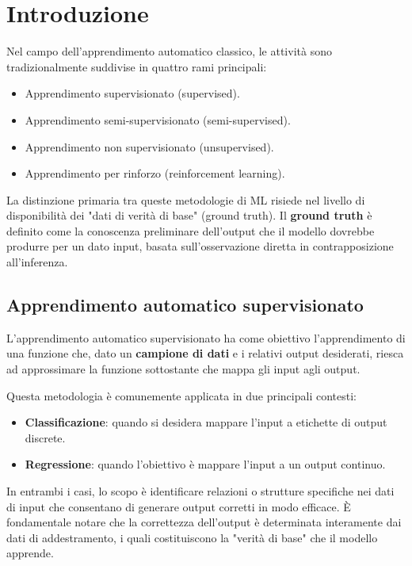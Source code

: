 \section{Introduzione}

Nel campo dell'apprendimento automatico classico,
le attività sono tradizionalmente suddivise in
quattro rami principali:
\begin{itemize}
    \item Apprendimento supervisionato (supervised).
    \item Apprendimento semi-supervisionato (semi-supervised).
    \item Apprendimento non supervisionato (unsupervised).
    \item Apprendimento per rinforzo (reinforcement learning).
\end{itemize}

La distinzione primaria tra queste metodologie di ML risiede nel
livello di disponibilità dei "dati di verità di base" (ground truth).
Il \textbf{ground truth} è definito come la conoscenza preliminare dell'output
che il modello dovrebbe produrre per un dato input, basata sull'osservazione
diretta in contrapposizione all'inferenza.

\subsection{Apprendimento automatico supervisionato}

L'apprendimento automatico supervisionato ha come obiettivo l'apprendimento di
una funzione che, dato un \textbf{campione di dati} e i relativi output desiderati,
riesca ad approssimare la funzione sottostante che mappa gli input agli output.

Questa metodologia è comunemente applicata in due principali contesti:
\begin{itemize}
    \item \textbf{Classificazione}: quando si desidera mappare l'input a
    etichette di output discrete.
    \item \textbf{Regressione}: quando l'obiettivo è mappare l'input a un
    output continuo.
\end{itemize}

In entrambi i casi, lo scopo è identificare relazioni o strutture specifiche
nei dati di input che consentano di generare output corretti in modo efficace.
È fondamentale notare che la correttezza dell'output è determinata interamente
dai dati di addestramento, i quali costituiscono la "verità di base" che il
modello apprende.

